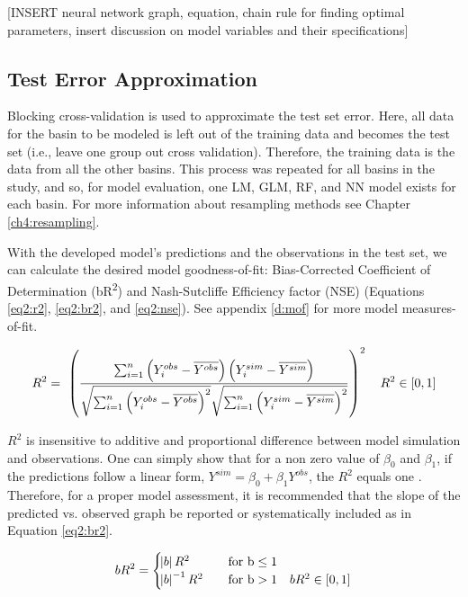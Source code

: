 [INSERT neural network graph, equation, chain rule for finding optimal parameters, insert discussion on model variables and their specifications] 

\subsection{Test Error Approximation}
Blocking cross-validation is used to approximate the test set error. Here, all data for the basin to be modeled is left out of the training data and becomes the test set (i.e., leave one group out cross validation). Therefore, the training data is the data from all the other basins. This process was repeated for all basins in the study, and so, for model evaluation, one LM, GLM, RF, and NN model exists for each basin. For more information about resampling methods see Chapter \ref{ch4:resampling}.

With the developed model's predictions and the observations in the test set, we can calculate the desired model goodness-of-fit: Bias-Corrected Coefficient of Determination (bR\textsuperscript{2}) and Nash-Sutcliffe Efficiency factor (NSE) (Equations \ref{eq2:r2}, \ref{eq2:br2}, and  \ref{eq2:nse}). See appendix \ref{d:mof} for more model measures-of-fit.

\begin{equation} \label{eq2:r2}
	R^{2} = \ \left(\frac{\sum^n_{i=1}{\left(Y^{obs}_i-\overline{Y^{obs}}\right)\left(Y^{sim}_i-\overline{Y^{sim}}\right)}}{\sqrt{\sum^n_{i=1}{\left(Y^{obs}_i-\overline{Y^{obs}}\right)^2}}\sqrt{\sum^n_{i=1}{\left(Y^{sim}_i-\overline{Y^{sim}}\right)^2}}}\right)^2  \quad R^{2} \in [0,1] \\
\end{equation}

$R^2$ is insensitive to additive and proportional difference between model simulation and observations. One can simply show that for a non zero value of $\beta_0$ and $\beta_1$, if the predictions follow a linear form, $Y^{sim}=\beta_0 + \beta_1 Y^{obs}$, the $R^2$ equals one \cite{legates1999evaluating}. Therefore, for a proper model assessment, it is recommended that the slope of the predicted vs. observed graph be reported or systematically included as in Equation \ref{eq2:br2}. 

\begin{equation} \label{eq2:br2}   
	bR^{2} =  
	\begin{cases}
		\text{$\abs{b}R^2$} & \quad\text{for b}\le1\\
		\text{$\abs{b}^{-1}R^2$} &\quad\text{for b}>1  \quad bR^{2} \in [0,1] \\
	\end{cases}
\end{equation}

